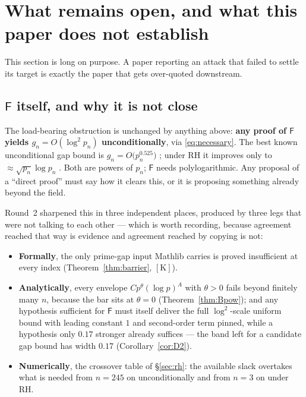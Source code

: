 \documentclass[11pt,a4paper]{article}
\theoremstyle{plain}
\theoremstyle{definition}
\theoremstyle{remark}
\newcommand{\cK}{{[\mathrm{K}]}}
\newcommand{\Fb}{\mathsf{F}}
\begin{document}
\section{What remains open, and what this paper does not establish}
\label{sec:limits}

This section is long on purpose. A paper reporting an attack that failed to settle its target
is exactly the paper that gets over-quoted downstream.

\subsection{$\Fb$ itself, and why it is not close}

The load-bearing obstruction is unchanged by anything above: \textbf{any proof of $\Fb$
yields $g_n = O(\log^2 p_n)$ unconditionally}, via \eqref{eq:necessary}. The best known
unconditional gap bound is $g_n = O\bigl(p_n^{0.525}\bigr)$ \cite{baker2001difference}; under RH it
improves only to $\approx\sqrt{p_n}\log p_n$ \cite{carneiro2019fourier}. Both are powers of
$p_n$; $\Fb$ needs polylogarithmic. Any proposal of a ``direct proof'' must say how it clears
this, or it is proposing something already beyond the field.

Round~2 sharpened this in three independent places, produced by three legs that were not
talking to each other --- which is worth recording, because agreement reached that way is
evidence and agreement reached by copying is not:
\begin{itemize}
\item \textbf{Formally}, the only prime-gap input Mathlib carries is proved insufficient at
  every index (Theorem~\ref{thm:barrier}, $\cK$).
\item \textbf{Analytically}, every envelope $Cp^\theta(\log p)^A$ with $\theta > 0$ fails
  beyond finitely many $n$, because the bar sits at $\theta = 0$
  (Theorem~\ref{thm:Bpow}); and any hypothesis sufficient for $\Fb$ must itself deliver the
  full $\log^2$-scale uniform bound with leading constant $1$ and second-order term pinned,
  while a hypothesis only $0.17$ stronger already suffices --- the band left for a candidate
  gap bound has width $0.17$ (Corollary~\ref{cor:D2}).
\item \textbf{Numerically}, the crossover table of \S\ref{sec:rh}: the available slack
  overtakes what is needed from $n = 245$ on unconditionally and from $n = 3$ on under RH.
\end{itemize}
\end{document}
